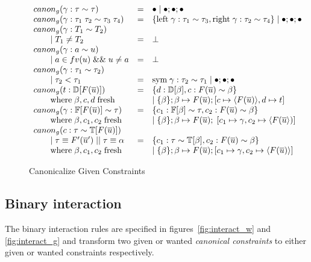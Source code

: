 \begin{figure}
\small
{}
\[
\begin{array}{l c l}
canon_g(\gamma : \tau \sim \tau) &=& \bullet \mid \bullet ; \bullet ; \bullet
\\
canon_g(\gamma : \tau_1 \; \tau_2 \sim \tau_3 \; \tau_4) &=& \{ \text{left} \;
\gamma : \tau_1 \sim \tau_3, \text{right} \; \gamma : \tau_2 \sim \tau_4\} \mid
\bullet ; \bullet ; \bullet
\\
canon_g(\gamma : T_1 \sim T_2)
\\ \qquad \mid T_1 \neq T_2 &=& \bot
\\
canon_g(\gamma : a \sim u)
\\
\qquad \mid a \in fv(u) \; \&\& \; u \neq a &=& \bot
\\
canon_g(\gamma : \tau_1 \sim \tau_2)
\\ \qquad \mid \tau_2 < \tau_1 &=& \text{sym} \; \gamma : \tau_2 \sim \tau_1
\mid \bullet ; \bullet ; \bullet
\\
canon_g(t : \mathbb{D}[F(\overline{u})]) &=& \{ d : \mathbb{D}[\beta], c :
F(\overline{u}) \sim \beta\}
\\ \qquad \text{where} \; \beta, c, d \; \text{fresh} && \mid \{\beta\} ; \beta \mapsto F(\overline{u}) ; [c
\mapsto \langle F(\overline{u}) \rangle, d \mapsto t]
\\
canon_g(\gamma : \mathbb{F}[F(\overline{u})] \sim \tau) &=& \{ c_1 :
\mathbb{F}[\beta] \sim \tau, c_2 : F(\overline{u}) \sim \beta\}
\\ \qquad \text{where} \; \beta, c_1, c_2 \; \text{fresh} && \mid \{ \beta \} ; \beta \mapsto F(\overline{u}) ; \; [c_1 \mapsto \gamma,
c_2 \mapsto \langle F(\overline{u}  \rangle)]
\\
canon_g(c : \tau \sim \mathbb{T}[F(\overline{u})])
\\ \qquad \mid \tau \equiv F'(\overline{u}') \; || \; \tau \equiv \alpha &=&
\{ c_1 : \tau \sim \mathbb{T}[\beta], c_2 : F(\overline{u}) \sim \beta\}
\\ \qquad \text{where} \; \beta, c_1, c_2 \; \text{fresh} && \mid \{\beta\} ; \beta \mapsto F(\overline{u}) ; [c_1 \mapsto \gamma, c_2
\mapsto \langle F(\overline{u}) \rangle]
\end{array}
\]
\caption{Canonicalize Given Constraints}
\label{fig:canon_g}
\end{figure}

\subsection{Binary interaction}
The binary interaction rules are specified in figures~\ref{fig:interact_w} and
\ref{fig:interact_g} and transform two given or wanted \textit{canonical
constraints} to either given or wanted constraints respectively.

